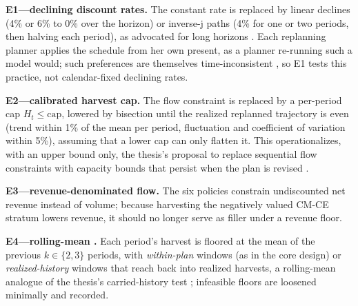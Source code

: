 \textbf{E1---declining discount rates.} The constant rate is replaced by linear declines (4\% or 6\% to 0\% over the horizon) or inverse-j paths (4\% for one or two periods, then halving each period), as advocated for long horizons \citep{weitzman2001gamma,hepburn2007recent}. Each replanning planner applies the schedule from her own present, as a planner re-running such a model would; such preferences are themselves time-inconsistent \citep{strotz1956myopia}, so E1 tests this practice, not calendar-fixed declining rates.

\textbf{E2---calibrated harvest cap.} The flow constraint is replaced by a per-period cap \(H_t \leq \mathrm{cap}\), lowered by bisection until the realized replanned trajectory is even (trend within 1\% of the mean per period, fluctuation and coefficient of variation within 5\%), assuming that a lower cap can only flatten it. This operationalizes, with an upper bound only, the thesis's proposal to replace sequential flow constraints with capacity bounds that persist when the plan is revised \citep[pp.~134--135, 137]{daugherty1991credibility}.

\textbf{E3---revenue-denominated flow.} The six policies constrain undiscounted net revenue instead of volume; because harvesting the negatively valued CM-CE stratum lowers revenue, it should no longer serve as filler under a revenue floor.

\textbf{E4---rolling-mean .} Each period's harvest is floored at the mean of the previous \(k \in \{2, 3\}\) periods, with \emph{within-plan} windows (as in the core design) or \emph{realized-history} windows that reach back into realized harvests, a rolling-mean analogue of the thesis's carried-history test \citep[p.~120]{daugherty1991credibility}; infeasible floors are loosened minimally and recorded.
